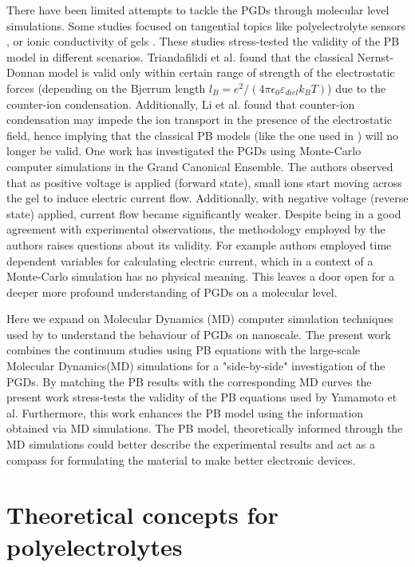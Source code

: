 \documentclass[twoside,twocolumn,9pt]{article}
\begin{document}
There have been limited attempts to tackle the PGDs through molecular level simulations. Some studies focused on tangential topics like polyelectrolyte sensors \cite{Triandafilidi2018MolecularEffect}, or ionic conductivity of gels \cite{Li2016}. These studies stress-tested the validity of the PB model in different scenarios. Triandafilidi et al. \cite{Triandafilidi2018MolecularEffect} found that the classical Nernst-Donnan model is valid only within certain range of strength of the electrostatic forces (depending on the Bjerrum length $l_B = e^2/(4 \pi \epsilon_0\varepsilon_{diel}k_B T)$) due to the counter-ion condensation. Additionally, Li et al. \cite{Li2016} found that counter-ion condensation may impede the ion transport in the presence of the electrostatic field, hence implying that the classical PB models (like the one used in \cite{Yamamoto2014ElectrochemicalDiodes}) will no longer be valid. One work \cite{Lee2012Grand-canonicalDiode} has investigated the PGDs using Monte-Carlo computer simulations in the Grand Canonical Ensemble. The authors observed that as positive voltage is applied (forward state), small ions start moving across the gel to induce electric current flow. Additionally, with negative voltage (reverse state) applied, current flow became significantly weaker. Despite being in a good agreement with experimental observations, the methodology employed by the authors raises questions about its validity. For example authors employed time dependent variables  for calculating electric current, which in a context of a Monte-Carlo simulation has no physical meaning. This leaves a door open for a deeper more profound understanding of PGDs on a molecular level.


Here we expand on Molecular Dynamics (MD) computer simulation techniques used by \cite{Li2016,Triandafilidi2018MolecularEffect} to understand the behaviour of PGDs on nanoscale.  The present work combines the continuum studies using PB equations with the large-scale Molecular Dynamics(MD) simulations for a "side-by-side" investigation of the PGDs. By matching the PB results with the corresponding MD curves the present work stress-tests the validity of the PB equations used by Yamamoto et al. Furthermore, this work enhances the PB model using the information obtained via MD simulations. The PB model, theoretically informed through the MD simulations could better describe the experimental results and act as a compass for formulating the material to make better electronic devices.


\section{Theoretical concepts for polyelectrolytes}
\label{theor_background}
\end{document}
